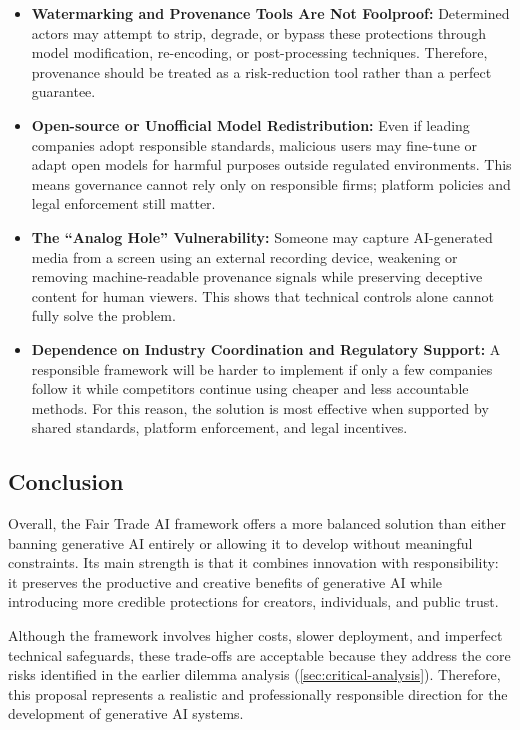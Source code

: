 \begin{itemize}
    \item \textbf{Watermarking and Provenance Tools Are Not Foolproof:} Determined actors may attempt to strip, degrade, or bypass these protections through model modification, re-encoding, or post-processing techniques. Therefore, provenance should be treated as a risk-reduction tool rather than a perfect guarantee.

    \item \textbf{Open-source or Unofficial Model Redistribution:} Even if leading companies adopt responsible standards, malicious users may fine-tune or adapt open models for harmful purposes outside regulated environments. This means governance cannot rely only on responsible firms; platform policies and legal enforcement still matter.

    \item \textbf{The ``Analog Hole'' Vulnerability:} Someone may capture AI-generated media from a screen using an external recording device, weakening or removing machine-readable provenance signals while preserving deceptive content for human viewers. This shows that technical controls alone cannot fully solve the problem.

    \item \textbf{Dependence on Industry Coordination and Regulatory Support:} A responsible framework will be harder to implement if only a few companies follow it while competitors continue using cheaper and less accountable methods. For this reason, the solution is most effective when supported by shared standards, platform enforcement, and legal incentives.
\end{itemize}

\subsection{Conclusion}\label{sec:solution-conclusion}
Overall, the Fair Trade AI framework offers a more balanced solution than either banning generative AI entirely or allowing it to develop without meaningful constraints. Its main strength is that it combines innovation with responsibility: it preserves the productive and creative benefits of generative AI while introducing more credible protections for creators, individuals, and public trust.

Although the framework involves higher costs, slower deployment, and imperfect technical safeguards, these trade-offs are acceptable because they address the core risks identified in the earlier dilemma analysis (\cref{sec:critical-analysis}). Therefore, this proposal represents a realistic and professionally responsible direction for the development of generative AI systems.
